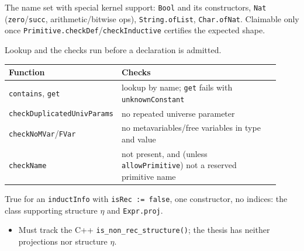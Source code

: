 \begin{definition}
\label{def:kernel-primitives}
\leanok
{} The name set with special kernel support: \texttt{Bool} and its constructors,
\texttt{Nat} (\texttt{zero}/\texttt{succ}, arithmetic/bitwise ops), \texttt{String.ofList},
\texttt{Char.ofNat}. Claimable only once \texttt{Primitive.checkDef}/\texttt{checkInductive}
certifies the expected shape.
\end{definition}

\begin{definition}
\label{family:kernel-env-checks}
\leanok
{}

 Lookup and the checks run before a declaration is admitted.
\par\smallskip\noindent
\begin{tabular}{p{0.29\linewidth}p{0.63\linewidth}}
\toprule
Function & Checks \\
\midrule
\texttt{contains}, \texttt{get} & lookup by name; \texttt{get} fails with
\texttt{unknownConstant} \\
\texttt{checkDuplicatedUnivParams} & no repeated universe parameter \\
\texttt{checkNoMVar}/\texttt{FVar} & no metavariables/free variables in type and value \\
\texttt{checkName} & not present, and (unless \texttt{allowPrimitive}) not a reserved primitive
name \\
\bottomrule
\end{tabular}\par\smallskip
\end{definition}

\begin{definition}
\label{def:kernel-is-nonrec-structure}
\leanok
{} True for an \texttt{inductInfo} with \texttt{isRec := false}, one constructor, no
indices: the class supporting structure $\eta$ and \texttt{Expr.proj}.
\begin{itemize}
\item {} Must track the C++ \texttt{is\_non\_rec\_structure()}; the thesis has neither
projections nor structure $\eta$.
\end{itemize}
\end{definition}

